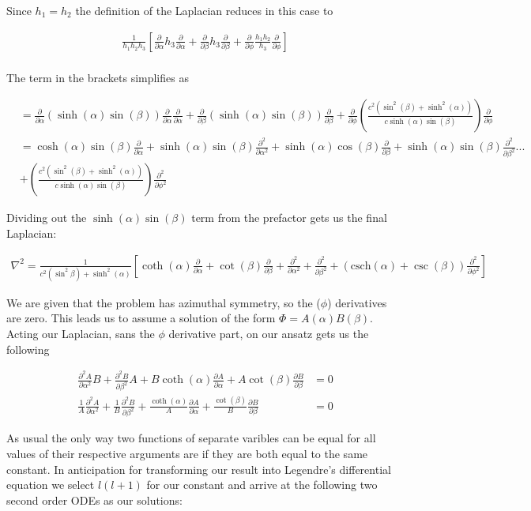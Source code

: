 \documentclass[paper=a4, fontsize=11pt]{scrartcl} %
\newcommand{\partd}[2]{\frac{\partial #1}{\partial #2}}
\newcommand{\partdd}[2]{\frac{\partial^2 #1}{\partial #2^2}}
\newcommand{\csch}{\text{csch}}
\numberwithin{equation}{section} %
\numberwithin{figure}{section} %
\numberwithin{table}{section} %
\begin{document}
Since $h_1 = h_2$ the definition of the Laplacian reduces in this case to

\begin{align}
\frac{1}{h_1h_2h_3}\left[\partd{}{\alpha}h_3\partd{}{\alpha} + \partd{}{\beta}h_3\partd{}{\beta} + \partd{}{\phi}\frac{h_1h_2}{h_3}\partd{}{\phi}\right] \\
\end{align}

The term in the brackets simplifies as 

\begin{align}
&=\partd{}{\alpha}(\sinh(\alpha)\sin(\beta))\partd{}{\alpha}\partd{}{\alpha} + \partd{}{\beta}(\sinh(\alpha)\sin(\beta))\partd{}{\beta} + \partd{}{\phi}\left(\frac{c^2(\sin^2(\beta)+\sinh^2(\alpha))}{c\sinh(\alpha)\sin(\beta)}\right)\partd{}{\phi} \\
&= \cosh(\alpha)\sin(\beta)\partd{}{\alpha} + \sinh(\alpha)\sin(\beta)\partdd{}{\alpha} + \sinh(\alpha)\cos(\beta)\partd{}{\beta} + \sinh(\alpha)\sin(\beta)\partdd{}{\beta} ... \\
&+ \left(\frac{c^2(\sin^2(\beta)+\sinh^2(\alpha))}{c\sinh(\alpha)\sin(\beta)}\right)\partdd{}{\phi}
\end{align}

Dividing out the $\sinh(\alpha)\sin(\beta)$ term from the prefactor gets us the final Laplacian:

\begin{align}
\nabla^2 = \frac{1}{c^2(\sin^2\beta)+\sinh^2(\alpha)}\left[\coth(\alpha)\partd{}{\alpha} + \cot(\beta)\partd{}{\beta}+ \partdd{}{\alpha} + \partdd{}{\beta} + (\csch(\alpha) + \csc(\beta))\partdd{}{\phi}\right]
\end{align}

We are given that the problem has azimuthal symmetry, so the ($\phi$) derivatives are zero. This leads us to assume a solution of the form $\Phi = A(\alpha)B(\beta)$. Acting our Laplacian, sans the $\phi$ derivative part, on our ansatz gets us the following

\begin{align}
\partdd{A}{\alpha}B + \partdd{B}{\beta}A + B\coth(\alpha)\partd{A}{\alpha} + A\cot(\beta)\partd{B}{\beta} &= 0 \\
\frac{1}{A}\partdd{A}{\alpha} + \frac{1}{B}\partdd{B}{\beta} + \frac{\coth(\alpha)}{A}\partd{A}{\alpha} + \frac{\cot(\beta)}{B}\partd{B}{\beta} &= 0
\end{align}

As usual the only way two functions of separate varibles can be equal for all values of their respective arguments are if they are both equal to the same constant. In anticipation for transforming our result into Legendre's differential equation we select $l(l+1)$ for our constant and arrive at the following two second order ODEs as our solutions:
\end{document}
